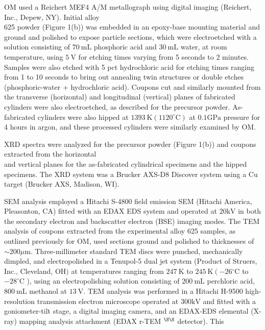 \documentclass[10pt]{article}
\begin{document}
OM used a Reichert MEF4 A/M metallograph using digital imaging (Reichert, Inc., Depew, NY). Initial alloy\\
625 powder (Figure 1(b)) was embedded in an epoxy-base mounting material and ground and polished to expose particle sections, which were electroetched with a solution consisting of $70 \mathrm{~mL}$ phosphoric acid and $30 \mathrm{~mL}$ water, at room temperature, using $5 \mathrm{~V}$ for etching times varying from 5 seconds to 2 minutes. Samples were also etched with 5 pct hydrochloric acid for etching times ranging from 1 to 10 seconds to bring out annealing twin structures or double etches (phosphoric-water + hydrochloric acid). Coupons cut and similarly mounted from the transverse (horizontal) and longitudinal (vertical) planes of fabricated cylinders were also electroetched, as described for the precursor powder. As-fabricated cylinders were also hipped at $1393 \mathrm{~K}\left(1120^{\circ} \mathrm{C}\right)$ at $0.1 \mathrm{GPa}$ pressure for 4 hours in argon, and these processed cylinders were similarly examined by OM.

XRD spectra were analyzed for the precursor powder (Figure 1(b)) and coupons extracted from the horizontal\\
and vertical planes for the as-fabricated cylindrical specimens and the hipped specimens. The XRD system was a Brucker AXS-D8 Discover system using a $\mathrm{Cu}$ target (Brucker AXS, Madison, WI).

SEM analysis employed a Hitachi S-4800 field emission SEM (Hitachi America, Pleasonton, CA) fitted with an EDAX EDS system and operated at $20 \mathrm{kV}$ in both the secondary electron and backscatter electron (BSE) imaging modes. The TEM analysis of coupons extracted from the experimental alloy 625 samples, as outlined previously for OM, used sections ground and polished to thicknesses of $\sim 200 \mu \mathrm{m}$. Three-millimeter standard TEM discs were punched, mechanically dimpled, and electropolished in a Tenupol-5 dual jet system (Product of Struers, Inc., Cleveland, $\mathrm{OH})$ at temperatures ranging from $247 \mathrm{~K}$ to $245 \mathrm{~K}\left(-26{ }^{\circ} \mathrm{C}\right.$ to $-28^{\circ} \mathrm{C}$ ), using an electropolishing solution consisting of $200 \mathrm{~mL}$ perchloric acid, $800 \mathrm{~mL}$ methanol at $13 \mathrm{~V}$. TEM analysis was performed in a Hitachi H-9500 high-resolution transmission electron microscope operated at $300 \mathrm{kV}$ and fitted with a goniometer-tilt stage, a digital imaging camera, and an EDAX-EDS elemental (X-ray) mapping analysis attachment (EDAX r-TEM ${ }^{\S \S}$ detector). This
\end{document}
